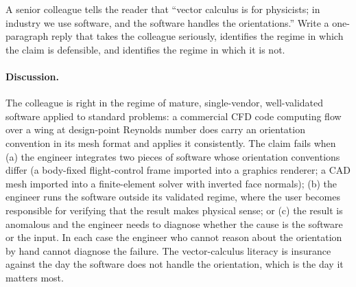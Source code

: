 \begin{exercise}
A senior colleague tells the reader that ``vector calculus is for
physicists; in industry we use software, and the software handles
the orientations.'' Write a one-paragraph reply that takes the
colleague seriously, identifies the regime in which the claim is
defensible, and identifies the regime in which it is not.

\paragraph{Discussion.} The colleague is right in the regime of
mature, single-vendor, well-validated software applied to standard
problems: a commercial CFD code computing flow over a wing at
design-point Reynolds number does carry an orientation convention
in its mesh format and applies it consistently. The claim fails
when (a) the engineer integrates two pieces of software whose
orientation conventions differ (a body-fixed flight-control frame
imported into a graphics renderer; a CAD mesh imported into a
finite-element solver with inverted face normals); (b) the engineer
runs the software outside its validated regime, where the user
becomes responsible for verifying that the result makes physical
sense; or (c) the result is anomalous and the engineer needs to
diagnose whether the cause is the software or the input. In each
case the engineer who cannot reason about the orientation by hand
cannot diagnose the failure. The vector-calculus literacy is
insurance against the day the software does not handle the
orientation, which is the day it matters most.
\end{exercise}

